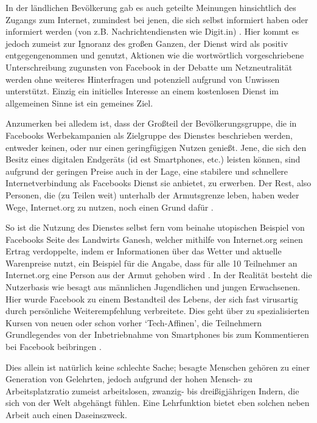 \documentclass{article}
\begin{document}
In der ländlichen Bevölkerung gab es auch geteilte Meinungen hinsichtlich des Zugangs zum Internet, zumindest bei jenen, die sich selbst informiert haben oder informiert werden (von z.B. Nachrichtendiensten wie Digit.in) \parencite{digitYT}.
Hier kommt es jedoch zumeist zur Ignoranz des großen Ganzen, der Dienst wird als positiv entgegengenommen und genutzt, Aktionen wie die wortwörtlich vorgeschriebene Unterschreibung zugunsten von Facebook in der Debatte um Netzneutralität\autocite{ndtvYT} werden ohne weiteres Hinterfragen und potenziell aufgrund von Unwissen unterstützt.
Einzig ein initielles Interesse an einem kostenlosen Dienst im allgemeinen Sinne ist ein gemeines Ziel.

\medskip

Anzumerken bei alledem ist, dass der Großteil der Bevölkerungsgruppe, die in Facebooks Werbekampanien als Zielgruppe des Dienstes beschrieben werden, entweder keinen, oder nur einen geringfügigen Nutzen genießt.
Jene, die sich den Besitz eines digitalen Endgeräts (id est Smartphones, etc.) leisten können, sind aufgrund der geringen Preise auch in der Lage, eine stabilere und schnellere Internetverbindung als Facebooks Dienst sie anbietet, zu erwerben.
Der Rest, also Personen, die (zu Teilen weit) unterhalb der Armutsgrenze leben, haben weder Wege, Internet.org zu nutzen, noch einen Grund dafür \parencite[257]{everydayLife}.

\medskip

So ist die Nutzung des Dienstes selbst fern vom beinahe utopischen Beispiel von Facebooks Seite des Landwirts Ganesh, welcher mithilfe von Internet.org seinen Ertrag verdoppelte, indem er Informationen über das Wetter und aktuelle Warenpreise nutzt, ein Beispiel für die Angabe, dass für alle 10 Teilnehmer an Internet.org eine Person aus der Armut gehoben wird \parencite[4]{prasad2017}.
In der Realität besteht die Nutzerbasis wie besagt aus männlichen Jugendlichen und jungen Erwachsenen.
Hier wurde Facebook zu einem Bestandteil des Lebens, der sich fast virusartig durch persönliche Weiterempfehlung verbreitete.
Dies geht über zu spezialisierten Kursen von neuen oder schon vorher `Tech-Affinen', die Teilnehmern Grundlegendes von der Inbetriebnahme von Smartphones bis zum Kommentieren bei Facebook beibringen \parencite{empowermentThroughFacebook}.

\medskip

Dies allein ist natürlich keine schlechte Sache; besagte Menschen gehören zu einer Generation von Gelehrten, jedoch aufgrund der hohen Mensch- zu Arbeitsplatzratio zumeist arbeitslosen, zwanzig- bis dreißigjährigen Indern, die sich von der Welt abgehängt fühlen.
Eine Lehrfunktion bietet eben solchen neben Arbeit auch einen Daseinszweck.
\end{document}
